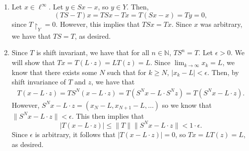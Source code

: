 \documentclass[11pt]{article}
\newcommand{\N}{\mathbb{N}}
\newcommand{\restr}[2]{#1\!\upharpoonright_{#2}}
\begin{document}
\begin{enumerate}[label=\arabic*., leftmargin=*, itemsep=10pt]
\begin{enumerate}
    \item Let $x \in \ell^{\infty}$. Let $y \in Sx - x$, so $y \in Y$.
        Then,
        \[
            (TS - T)x = TSx - Tx = T(Sx - x) = Ty = 0
        ,\] 
        since $\restr{T}{Y} = 0$.
        However, this implies that $TSx = Tx$.
        Since $x$ was arbitrary, we have that $TS = T$, as desired.
    \item Since $T$ is shift invariant, we have that for all $n \in \N$, $TS^{n} = T$.
        Let $\epsilon > 0$. We will show that $Tx = T(L\cdot z) = LT(z) = L$.
        Since $\lim_{k \to \infty} x_k = L$, we know that there exists some $N$ such that for $k \geq N$, $|x_k - L| < \epsilon$.
        Then, by shift invariance of $T$ and $z$, we have that
        \begin{align*}
            T(x - L\cdot z) = TS^{N}(x - L \cdot z) = T(S^{N}x - L\cdot S^{N}z) = T(S^{N}x - L \cdot z)
        .\end{align*}
        However, $S^{N}x - L \cdot z = (x_N - L, x_{N+1} - L, \ldots) $ so we know that $\|S^{N}x - L \cdot z\| < \epsilon$.
        This then implies that
        \[
        |T(x - L \cdot z)| \leq \|T\| \|S^{N}x - L \cdot z\| < 1 \cdot \epsilon
        .\] 
        Since $\epsilon$ is arbitrary, it follows that $|T(x - L \cdot z)| = 0$, so $Tx = L T(z) = L$, as desired.
\end{enumerate}

\end{enumerate}
\end{document}
